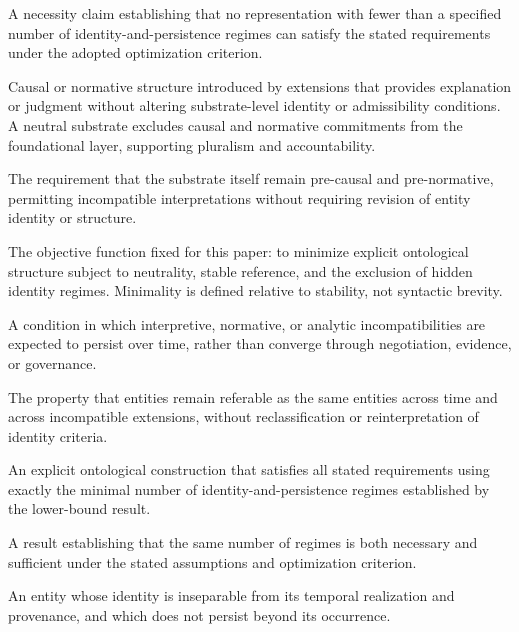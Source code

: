 \begin{description}[style=nextline,leftmargin=1.5cm]
  \item[Lower-Bound Result]
        A necessity claim establishing that no representation
        with fewer than a specified number of identity-and-persistence regimes
        can satisfy the stated requirements under the adopted optimization criterion.

  \item[Neutral Substrate]
        Causal or normative structure introduced by extensions that
        provides explanation or judgment without altering substrate-level
        identity or admissibility conditions.
        A neutral substrate excludes causal and normative commitments
        from the foundational layer,
        supporting pluralism and accountability.

  \item[Neutrality Constraint]
        The requirement that the substrate itself
        remain pre-causal and pre-normative,
        permitting incompatible interpretations
        without requiring revision of entity identity or structure.

  \item[Optimization Criterion]
        The objective function fixed for this paper:
        to minimize explicit ontological structure
        subject to neutrality, stable reference,
        and the exclusion of hidden identity regimes.
        Minimality is defined relative to stability, not syntactic brevity.

  \item[Persistent Disagreement]
        A condition in which interpretive, normative,
        or analytic incompatibilities are expected to persist over time,
        rather than converge through negotiation, evidence, or governance.

  \item[Stable Reference]
        The property that entities remain referable
        as the same entities across time and across incompatible extensions,
        without reclassification or reinterpretation of identity criteria.

  \item[Sufficiency Construction]
        An explicit ontological construction that satisfies all stated requirements
        using exactly the minimal number of identity-and-persistence regimes
        established by the lower-bound result.

  \item[Tight Bound]
        A result establishing that the same number of regimes
        is both necessary and sufficient
        under the stated assumptions and optimization criterion.

  \item[Time-Indexed Occurrence]
        An entity whose identity is inseparable from its temporal realization
        and provenance, and which does not persist beyond
        its occurrence.

\end{description}
